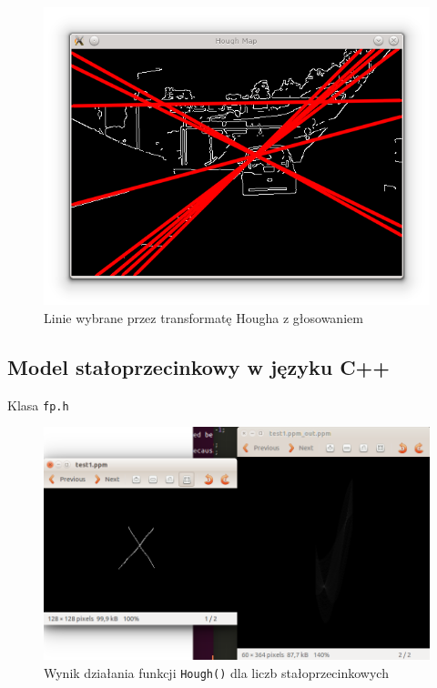 \begin{figure}[!htb]
  \includegraphics[width=\linewidth]{img/hough_screen.png}
  \caption{Linie wybrane przez transformatę Hougha z głosowaniem}\label{fig:awesome_image3}
\endminipage
\end{figure}

\blindtext

%

\newpage
\subsection{Model stałoprzecinkowy w języku C++}

Klasa \texttt{fp.h}

\begin{figure}[!htb]
\centering
\includegraphics[scale=0.75]{img/fixed.png}
\caption{Wynik działania funkcji \texttt{Hough()} dla liczb stałoprzecinkowych}
\label{rys:fp}
\end{figure}


